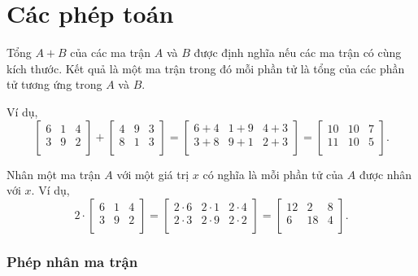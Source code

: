 \section{Các phép toán}

Tổng $A+B$ của các ma trận $A$ và $B$
được định nghĩa nếu các ma trận có cùng kích thước.
Kết quả là một ma trận trong đó mỗi phần tử
là tổng của các phần tử tương ứng
trong $A$ và $B$.

Ví dụ,
\[
 \begin{bmatrix}
  6 & 1 & 4 \\
  3 & 9 & 2 \\
 \end{bmatrix}
+
 \begin{bmatrix}
  4 & 9 & 3 \\
  8 & 1 & 3 \\
 \end{bmatrix}
=
 \begin{bmatrix}
  6+4 & 1+9 & 4+3 \\
  3+8 & 9+1 & 2+3 \\
 \end{bmatrix}
=
 \begin{bmatrix}
  10 & 10 & 7 \\
  11 & 10 & 5 \\
 \end{bmatrix}.
\]

Nhân một ma trận $A$ với một giá trị $x$ có nghĩa là
mỗi phần tử của $A$ được nhân với $x$.
Ví dụ,
\[
 2 \cdot \begin{bmatrix}
  6 & 1 & 4 \\
  3 & 9 & 2 \\
 \end{bmatrix}
=
 \begin{bmatrix}
  2 \cdot 6 & 2\cdot1 & 2\cdot4 \\
  2\cdot3 & 2\cdot9 & 2\cdot2 \\
 \end{bmatrix}
=
 \begin{bmatrix}
  12 & 2 & 8 \\
  6 & 18 & 4 \\
 \end{bmatrix}.
\]

\subsubsection{Phép nhân ma trận}


